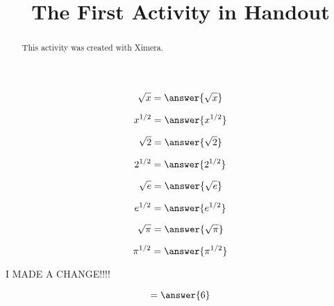 \documentclass[handout]{ximera}
\title{The First Activity in Handout}
\begin{document}
  
\begin{abstract}  
This activity was created with Ximera.
\end{abstract}  
\maketitle

\[
\sqrt{x} = \answer{\sqrt{x}}
\]

\[
x^{1/2} = \answer{x^{1/2}}
\]

\[
\sqrt{2} = \answer{\sqrt{2}}
\]

\[
2^{1/2} = \answer{2^{1/2}}
\] 

\[
\sqrt{e} = \answer{\sqrt{e}}
\]


\[
e^{1/2} = \answer{e^{1/2}}
\] 




\[
\sqrt{\pi} = \answer{\sqrt{\pi}}
\]


\[
\pi^{1/2} = \answer{\pi^{1/2}}
\] 

I MADE A CHANGE!!!!


\begin{problem}  
  \begin{prompt}
    \[
    = \answer{6}
    \]
  \end{prompt}
\end{problem}
\end{document}
